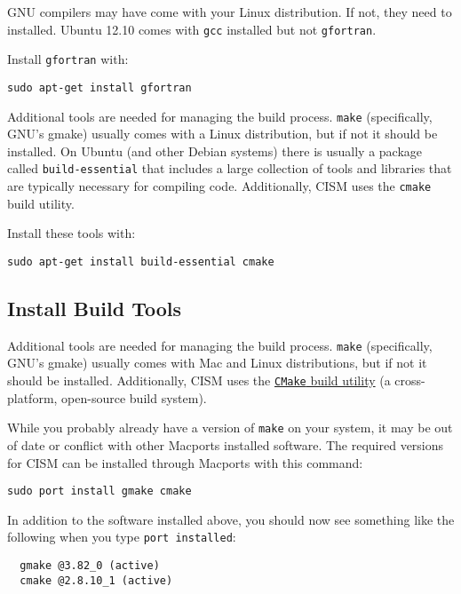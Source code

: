 \begin{mdframed}[style=ubuntu] %
GNU compilers may have come with your Linux distribution.  If not, they need to 
installed.  Ubuntu 12.10 comes with \texttt{gcc} installed but not \texttt{gfortran}.

Install \texttt{gfortran} with:

\texttt{sudo apt-get install gfortran}

Additional tools are needed for managing the build process.  \texttt{make} (specifically, GNU's gmake)
usually comes with a Linux distribution, but if not it should be installed.  On Ubuntu
(and other Debian systems) there is usually a package called \texttt{build-essential} that
includes a large collection of tools and libraries that are typically necessary
for compiling code.  Additionally, CISM uses the \texttt{cmake} build utility.

Install these tools with:

\texttt{sudo apt-get install build-essential cmake}

\end{mdframed}                 %


\subsection{Install Build Tools}

Additional tools are needed for managing the build process.  \texttt{make} (specifically, GNU's gmake)
usually comes with Mac and Linux distributions, but if not it should be installed.  
Additionally, CISM uses the \href{http://www.cmake.org/}{\texttt{CMake} build utility}
(a cross-platform, open-source build system).

\begin{mdframed}[style=mac] %

While you probably already have a version of \texttt{make} on your system, it may be out of date or conflict with other Macports installed software. The required versions for CISM can be installed through Macports with this command: 

\begin{verbatim}
sudo port install gmake cmake
\end{verbatim}

In addition to the software installed above, you should now see something like the following when you type \texttt{port installed}:

\begin{verbatim}
  gmake @3.82_0 (active)
  cmake @2.8.10_1 (active)
\end{verbatim}
\end{mdframed}              %




